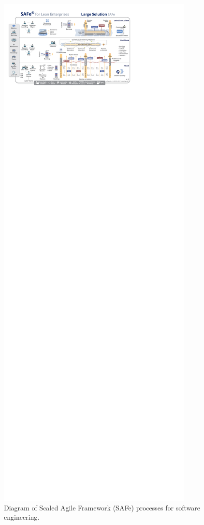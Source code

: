\documentclass[a4paper,
               biblatex,       %
               keeplastbox,    %
               ]{jacow-2_1}    %
\begin{document}
\label{sec:software_engineering_in_ska}
\begin{figure}[!tb]
  \centering
    \includegraphics[width=\textwidth]{FRAPL01f10.pdf}
  \caption{Diagram of Scaled Agile Framework (SAFe) processes for software engineering.}
  \label{fig:FRAPL01f10}
\end{figure}
\end{document}
